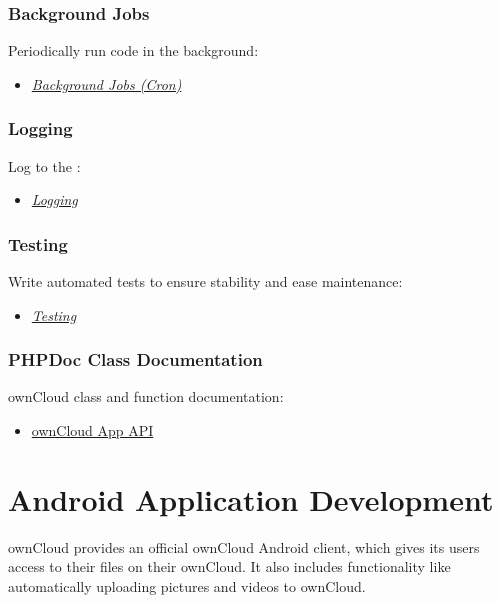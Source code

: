 \documentclass[letterpaper,10pt,english]{sphinxmanual}
\begin{document}
\subsubsection{Background Jobs}
\label{app/index:background-jobs}
Periodically run code in the background:
\begin{itemize}
\item {} 
{\hyperref[app/backgroundjobs::doc]{\emph{Background Jobs (Cron)}}}

\end{itemize}


\subsubsection{Logging}
\label{app/index:logging}
Log to the :
\begin{itemize}
\item {} 
{\hyperref[app/logging::doc]{\emph{Logging}}}

\end{itemize}


\subsubsection{Testing}
\label{app/index:testing}
Write automated tests to ensure stability and ease maintenance:
\begin{itemize}
\item {} 
{\hyperref[app/testing::doc]{\emph{Testing}}}

\end{itemize}


\subsubsection{PHPDoc Class Documentation}
\label{app/index:phpdoc-class-documentation}
ownCloud class and function documentation:
\begin{itemize}
\item {} 
\href{https://api.owncloud.org/namespaces/OCP.html}{ownCloud App API}

\end{itemize}


\section{Android Application Development}
\label{android_library/index:androidindex}\label{android_library/index::doc}\label{android_library/index:android-application-development}
ownCloud provides an official ownCloud Android client, which gives its users
access to their files on their ownCloud. It also includes functionality like
automatically uploading pictures and videos to ownCloud.
\end{document}
